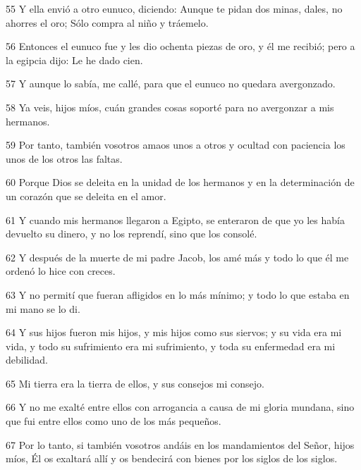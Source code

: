 \par 55 Y ella envió a otro eunuco, diciendo: Aunque te pidan dos minas, dales, no ahorres el oro; Sólo compra al niño y tráemelo.

\par 56 Entonces el eunuco fue y les dio ochenta piezas de oro, y él me recibió; pero a la egipcia dijo: Le he dado cien.

\par 57 Y aunque lo sabía, me callé, para que el eunuco no quedara avergonzado.

\par 58 Ya veis, hijos míos, cuán grandes cosas soporté para no avergonzar a mis hermanos.

\par 59 Por tanto, también vosotros amaos unos a otros y ocultad con paciencia los unos de los otros las faltas.

\par 60 Porque Dios se deleita en la unidad de los hermanos y en la determinación de un corazón que se deleita en el amor.

\par 61 Y cuando mis hermanos llegaron a Egipto, se enteraron de que yo les había devuelto su dinero, y no los reprendí, sino que los consolé.

\par 62 Y después de la muerte de mi padre Jacob, los amé más y todo lo que él me ordenó lo hice con creces.

\par 63 Y no permití que fueran afligidos en lo más mínimo; y todo lo que estaba en mi mano se lo di.

\par 64 Y sus hijos fueron mis hijos, y mis hijos como sus siervos; y su vida era mi vida, y todo su sufrimiento era mi sufrimiento, y toda su enfermedad era mi debilidad.

\par 65 Mi tierra era la tierra de ellos, y sus consejos mi consejo.

\par 66 Y no me exalté entre ellos con arrogancia a causa de mi gloria mundana, sino que fui entre ellos como uno de los más pequeños.

\par 67 Por lo tanto, si también vosotros andáis en los mandamientos del Señor, hijos míos, Él os exaltará allí y os bendecirá con bienes por los siglos de los siglos.

